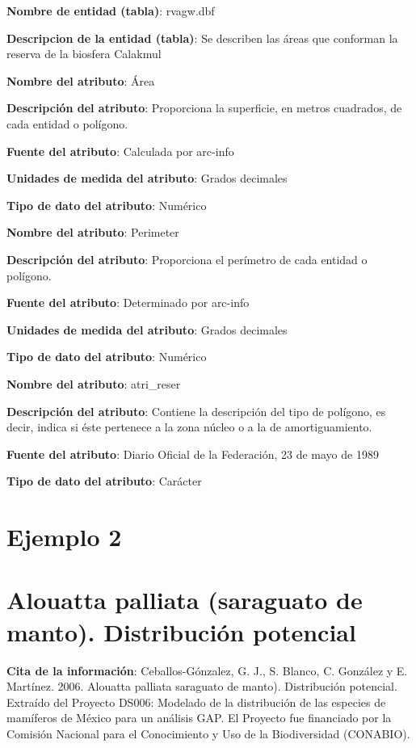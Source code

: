 \documentclass[twoside]{book}
\begin{document}
{\textbf{Nombre de entidad (tabla)}: rvagw.dbf

\textbf{Descripcion de la entidad (tabla)}: Se describen las áreas que conforman la reserva de la biosfera Calakmul

\textbf{Nombre del atributo}: Área

\textbf{Descripción del atributo}: Proporciona la superficie, en metros cuadrados, de cada entidad o polígono.

\textbf{Fuente del atributo}: Calculada por arc-info

\textbf{Unidades de medida del atributo}: Grados decimales

\textbf{Tipo de dato del atributo}: Numérico

\textbf{Nombre del atributo}: Perimeter

\textbf{Descripción del atributo}: Proporciona el perímetro de cada entidad o polígono.

\textbf{Fuente del atributo}: Determinado por arc-info

\textbf{Unidades de medida del atributo}: Grados decimales

\textbf{Tipo de dato del atributo}: Numérico

\textbf{Nombre del atributo}: atri\_reser

\textbf{Descripción del atributo}: Contiene la descripción del tipo de polígono, es decir, indica si éste pertenece a la zona núcleo o a la de amortiguamiento.

\textbf{Fuente del atributo}: Diario Oficial de la Federación, 23 de mayo de 1989


\textbf{Tipo de dato del atributo}: Carácter

\section*{Ejemplo 2}
\section*{Alouatta palliata (saraguato de manto). Distribución potencial}


\textbf{Cita de la información}: Ceballos-Gónzalez, G. J., S. Blanco, C. González y E. Martínez. 2006. Alouatta palliata saraguato de manto). Distribución potencial. Extraído del Proyecto DS006: Modelado de la distribución de las especies de mamíferos de México para un análisis GAP. El Proyecto fue financiado por la Comisión Nacional para el Conocimiento y Uso de la Biodiversidad (CONABIO).

}
\end{document}
